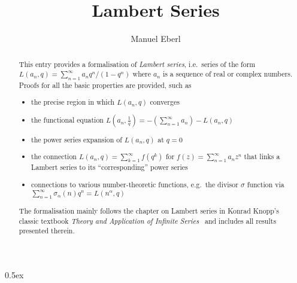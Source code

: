 \documentclass[11pt,a4paper]{article}
\begin{document}
\title{Lambert Series}
\author{Manuel Eberl}
\maketitle

\begin{abstract}
This entry provides a formalisation of \emph{Lambert series}, i.e.\ series of the form
$L(a_n, q) = \sum_{n=1}^\infty a_n q^n / (1-q^n)$ where $a_n$ is a sequence of real or complex
 numbers.
Proofs for all the basic properties are provided, such as
\begin{itemize}
\item the precise region in which $L(a_n, q)$ converges
\item the functional equation $L(a_n, \frac{1}{q}) = -(\sum_{n=1}^\infty a_n) - L(a_n, q)$
\item the power series expansion of $L(a_n, q)$ at $q = 0$
\item the connection $L(a_n, q) = \sum_{k=1}^\infty f(q^k)$ for $f(z) = \sum_{n=1}^\infty a_n z^n$
that links a Lambert series to its ``corresponding'' power series
\item connections to various number-theoretic functions, e.g.\ the divisor $\sigma$ function via
$\sum_{n=1}^\infty \sigma_{\alpha}(n) q^n = L(n^\alpha, q)$
\end{itemize}
The formalisation mainly follows the chapter on Lambert series in Konrad Knopp's classic textbook
\emph{Theory and Application of Infinite Series}~\cite{knopp2013} and includes all results
presented therein.
\end{abstract}

\newpage
\tableofcontents

\newpage
\parindent 0pt\parskip 0.5ex


\nocite{knopp2013}
\raggedright


\end{document}
